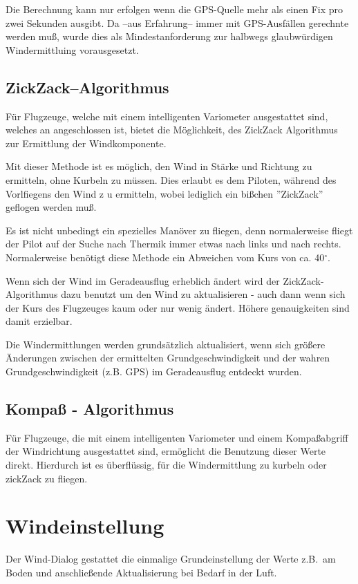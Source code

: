Die Berechnung kann nur erfolgen wenn die GPS-Quelle mehr als einen Fix pro zwei Sekunden ausgibt. 
Da --aus Erfahrung-- immer mit GPS-Ausfällen gerechnte werden muß, wurde dies als Mindestanforderung zur halbwegs glaubwürdigen Windermittluing vorausgesetzt.  
 
\subsection*{ZickZack--Algorithmus}
Für Flugzeuge, welche mit einem intelligenten Variometer ausgestattet sind, welches
an \xc angeschlossen ist, bietet \xc die Möglichkeit, des ZickZack Algorithmus
zur Ermittlung der Windkomponente.

Mit dieser Methode ist es möglich, den Wind in Stärke und Richtung zu ermitteln, ohne Kurbeln zu müssen.
Dies erlaubt es dem Piloten,  während des Vorlfiegens den Wind z u ermitteln, wobei lediglich ein
bißchen ''ZickZack'' geflogen werden muß.

Es ist nicht unbedingt ein spezielles Manöver zu fliegen, denn normalerweise  fliegt der Pilot auf
der Suche nach Thermik immer etwas nach links und nach rechts. Normalerweise benötigt diese
Methode ein Abweichen vom Kurs von ca. 40$^\circ$.

Wenn sich der Wind im Geradeausflug erheblich ändert wird der ZickZack-Algorithmus dazu benutzt
um den Wind zu aktualisieren - auch dann wenn sich der Kurs des Flugzeuges kaum oder nur wenig ändert.
Höhere genauigkeiten sind damit erzielbar.

Die Windermittlungen werden grundsätzlich aktualisiert, wenn sich größere Änderungen zwischen  der
ermittelten Grundgeschwindigkeit und der wahren Grundgeschwindigkeit (z.B. GPS)
im Geradeausflug entdeckt wurden.
\subsection*{Kompaß - Algorithmus}
Für Flugzeuge, die mit einem intelligenten Variometer und einem Kompaßabgriff der
Windrichtung ausgestattet sind, ermöglicht  \xc die Benutzung dieser Werte direkt.
Hierdurch ist es überflüssig, für die Windermittlung zu kurbeln oder zickZack zu fliegen.
\section{Windeinstellung}\label{sec:Windeinstellung}
Der Wind-Dialog gestattet die einmalige Grundeinstellung der Werte  z.B.\ am Boden und
anschließende Aktualisierung bei Bedarf in der Luft. 

